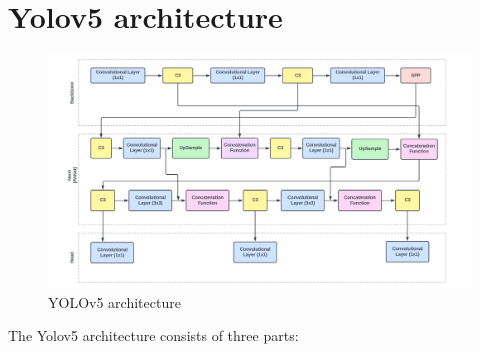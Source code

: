 \documentclass[12pt,a4paper]{report}
\begin{document}
\section {Yolov5 architecture}
\begin{figure}[!htb]
\begin{center}
\includegraphics[scale=0.5]{images/methodology/YOLOv5_architecture.png}
\caption{YOLOv5 architecture}
\end{center}
\end{figure}
\par The Yolov5 architecture consists of three parts:
 
\end{document}
